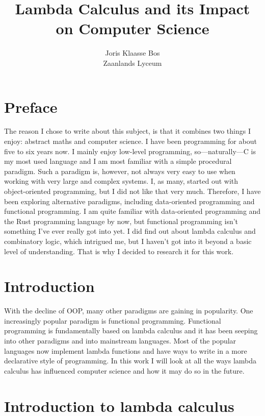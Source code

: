 \documentclass[11pt]{article}
\title{Lambda Calculus and its Impact on Computer Science}
\author{Joris Klaasse Bos\\ Zaanlands Lyceum}
\begin{document}
\maketitle
\newpage

\section*{Preface}


The reason I chose to write about this subject, is that it combines two things
I enjoy: abstract maths and computer science. I have been programming for about
five to six years now. I mainly enjoy low-level programming, so---naturally---C
is my most used language and I am most familiar with a simple procedural
paradigm. Such a paradigm is, however, not always very easy to use when working
with very large and complex systems. I, as many, started out with
object-oriented programming, but I did not like that very much. Therefore, I
have been exploring alternative paradigms, including data-oriented programming
and functional programming. I am quite familiar with data-oriented programming
and the Rust programming language by now, but functional programming isn't
something I've ever really got into yet. I did find out about lambda calculus
and combinatory logic, which intrigued me, but I haven’t got into it beyond a
basic level of understanding. That is why I decided to research it for this
work. 

\newpage

\tableofcontents
\newpage

\section{Introduction}

With the decline of OOP, many other paradigms are gaining in popularity. One
increasingly popular paradigm is functional programming. Functional programming
is fundamentally based on lambda calculus and it has been seeping into other
paradigms and into mainstream languages. Most of the popular languages now
implement lambda functions and have ways to write in a more declarative style
of programming. In this work I will look at all the ways lambda calculus has
influenced computer science and how it may do so in the future.

\section{Introduction to lambda calculus}
\end{document}
